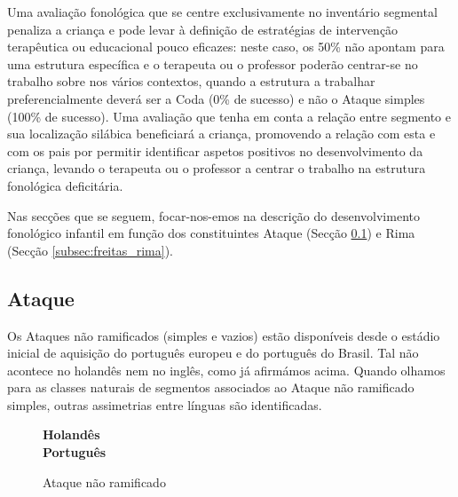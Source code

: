 \documentclass[output=paper]{LSP/langsci}
\begin{document}
Uma avaliação fonológica que se centre exclusivamente no inventário segmental penaliza a criança e pode levar à definição de estratégias de intervenção terapêutica ou educacional pouco eficazes: neste caso, os 50\% não apontam para uma estrutura específica e o terapeuta ou o professor poderão centrar-se no trabalho sobre \textipa{[l]} nos vários contextos, quando a estrutura a trabalhar preferencialmente deverá ser a Coda (0\% de sucesso) e não o Ataque simples (100\% de sucesso). Uma avaliação que tenha em conta a relação entre segmento e sua localização silábica beneficiará a criança, promovendo a relação com esta e com os pais por permitir identificar aspetos positivos no desenvolvimento da criança, levando o terapeuta ou o professor a centrar o trabalho na estrutura fonológica deficitária. 

Nas secções que se seguem, focar-nos-emos na descrição do desenvolvimento fonológico infantil em função dos constituintes Ataque (Secção \ref{subsec:freitas_ataque}) e Rima (Secção \ref{subsec:freitas_rima}).

\subsection{Ataque}
\label{subsec:freitas_ataque}

Os Ataques não ramificados (simples e vazios) estão disponíveis desde o estádio inicial de aquisição do português europeu e do português do Brasil. Tal não acontece no holandês nem no inglês, como já afirmámos acima. Quando olhamos para as classes naturais de segmentos associados ao Ataque não ramificado simples, outras assimetrias entre línguas são identificadas. 

\begin{figure}
\raggedright
\noindent\textbf{Holandês} \citep{fikkert1994}
~\\
\noindent\textbf{Português} \citep{freitas1997,lamprecht_etal2004}
\caption{Ataque não ramificado}
\label{fig:freitas_ataque_nao_ram}
\end{figure}
\end{document}
